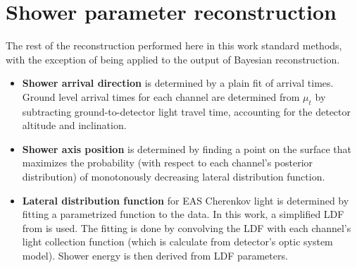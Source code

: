\section{Shower parameter reconstruction}

The rest of the reconstruction performed here in this work standard methods, with the exception of being applied to the output of Bayesian reconstruction.

\begin{itemize}
	\item \textbf{Shower arrival direction} is determined by a plain fit of arrival times. Ground level arrival times for each channel are determined from $\mu_t$ by subtracting ground-to-detector light travel time, accounting for the detector altitude and inclination.
	\item \textbf{Shower axis position} is determined by finding a point on the surface that maximizes the probability (with respect to each channel's posterior distribution) of monotonously decreasing lateral distribution function.
	\item \textbf{Lateral distribution function} for EAS Cherenkov light is determined by fitting a parametrized function to the data. In  this work, a simplified LDF from \cite{Budnev2005} is used. The fitting is done by convolving the LDF with each channel's light collection function (which is calculate from detector's optic system model). Shower energy is then derived from LDF parameters.
\end{itemize}
